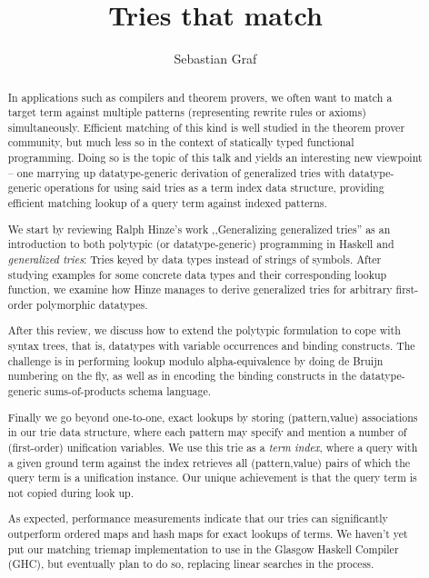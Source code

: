 \documentclass[sigplan,dvipsnames]{acmart}
\begin{document}
\title{Tries that match}

\author{Sebastian Graf}

\begin{abstract}
In applications such as compilers and theorem provers, we often want to match
a target term against multiple patterns (representing rewrite rules or axioms)
simultaneously. Efficient matching of this kind is well studied in the theorem prover
community, but much less so in the context of statically typed functional programming.
Doing so is the topic of this talk and yields an interesting new viewpoint
-- one marrying up datatype-generic derivation of generalized tries
\cite{hinze:generalized} with datatype-generic operations for using said tries
as a term index data structure, providing efficient matching lookup of a query
term against indexed patterns.

We start by reviewing Ralph Hinze's work ,,Generalizing generalized
tries'' \cite{hinze:generalized} as an introduction to both polytypic (or
datatype-generic) programming in Haskell and \emph{generalized tries}: Tries
keyed by data types instead of strings of symbols. After studying examples for
some concrete data types and their corresponding lookup function, we examine how
Hinze manages to derive generalized tries for arbitrary first-order polymorphic
datatypes.

After this review, we discuss how to extend the polytypic formulation to cope
with syntax trees, that is, datatypes with variable occurrences and binding
constructs. The challenge is in performing lookup modulo alpha-equivalence by
doing de Bruijn numbering on the fly, as well as in encoding the binding constructs
in the datatype-generic sums-of-products schema language.

Finally we go beyond one-to-one, exact lookups by storing (pattern,value)
associations in our trie data structure, where each pattern may specify and
mention a number of (first-order) unification variables. We use this trie as a
\emph{term index}, where a query with a given ground term against the index
retrieves all (pattern,value) pairs of which the query term is a unification
instance. Our unique achievement is that the query term is not copied during
look up.

As expected, performance measurements indicate that our tries can significantly
outperform ordered maps and hash maps for exact lookups of terms.
We haven't yet put our matching triemap implementation to use in the Glasgow
Haskell Compiler (GHC), but eventually plan to do so, replacing linear searches
in the process.


\end{abstract}
\end{document}
